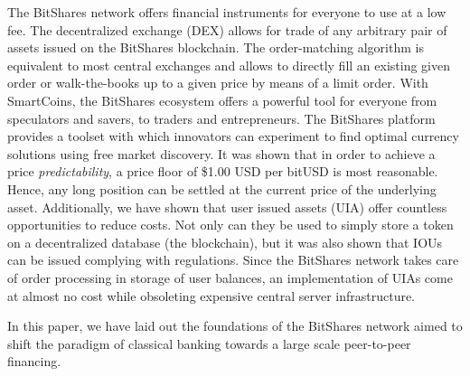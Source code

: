 The BitShares network offers financial instruments for everyone to use at a low
fee.
%
The decentralized exchange (DEX) allows for trade of any arbitrary pair of
assets issued on the BitShares blockchain. The order-matching algorithm is
equivalent to most central exchanges and allows to directly fill an existing
given order or walk-the-books up to a given price by means of a limit order.
%
With SmartCoins, the BitShares ecosystem offers a powerful tool for everyone
from speculators and savers, to traders and entrepreneurs. The BitShares
platform provides a toolset with which innovators can experiment to find
optimal currency solutions using free market discovery. It was shown that in
order to achieve a price \emph{predictability}, a price floor of \$1.00 USD per
bitUSD is most reasonable. Hence, any long position can be settled at the
current price of the underlying asset.
%
Additionally, we have shown that user issued assets (UIA) offer countless
opportunities to reduce costs. Not only can they be used to simply store a
token on a decentralized database (the blockchain), but it was also shown that
IOUs can be issued complying with regulations. Since the BitShares network
takes care of order processing in storage of user balances, an implementation
of UIAs come at almost no cost while obsoleting expensive central server
infrastructure. 
%
%

In this paper, we have laid out the foundations of the BitShares network aimed
to shift the paradigm of classical banking towards a large scale peer-to-peer
financing.
